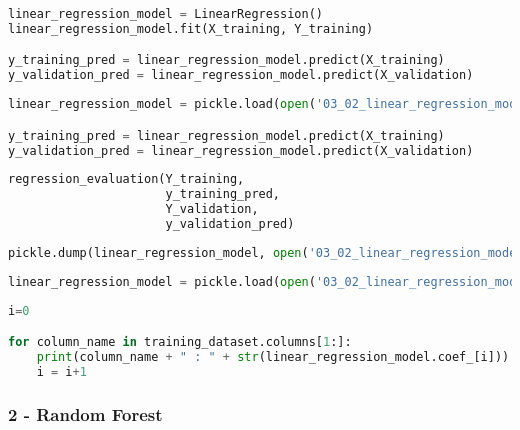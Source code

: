\begin{lstlisting}[language=Python]
linear_regression_model = LinearRegression()
linear_regression_model.fit(X_training, Y_training)

y_training_pred = linear_regression_model.predict(X_training)
y_validation_pred = linear_regression_model.predict(X_validation)
\end{lstlisting}

\begin{lstlisting}[language=Python]
linear_regression_model = pickle.load(open('03_02_linear_regression_model.pickle', 'rb'))

y_training_pred = linear_regression_model.predict(X_training)
y_validation_pred = linear_regression_model.predict(X_validation)
\end{lstlisting}

\begin{lstlisting}[language=Python]
regression_evaluation(Y_training,
                      y_training_pred,
                      Y_validation,
                      y_validation_pred)
\end{lstlisting}

\begin{lstlisting}[language=Python]
pickle.dump(linear_regression_model, open('03_02_linear_regression_model.pickle', 'wb'))
\end{lstlisting}

\begin{lstlisting}[language=Python]
linear_regression_model = pickle.load(open('03_02_linear_regression_model.pickle', 'rb'))
\end{lstlisting}

\begin{lstlisting}[language=Python]
i=0

for column_name in training_dataset.columns[1:]:
    print(column_name + " : " + str(linear_regression_model.coef_[i]))
    i = i+1
\end{lstlisting}

\hypertarget{random-forest}{%
\subsubsection{2 - Random Forest}\label{random-forest}}

